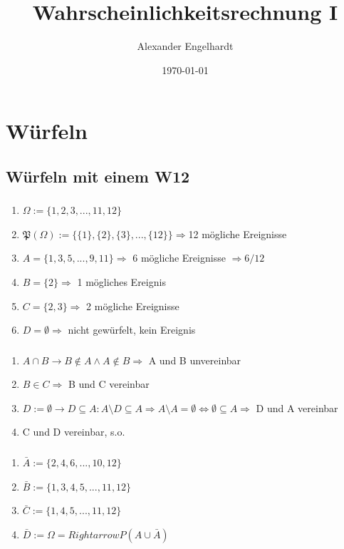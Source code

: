 \documentclass[12pt,a4paper]{article}
\title{Wahrscheinlichkeitsrechnung I}
\author{Alexander Engelhardt}
\date{\today}
\begin{document}
    \maketitle
    \setcounter{section}{1}
    \section{Würfeln}
    \subsection{Würfeln mit einem W12}
    \subsubsection{}
    \begin{enumerate}
        \item $\Omega := \{1, 2, 3, ..., 11, 12\}$ %
        \item $\mathfrak{P}(\Omega) := \{\{1\},\{2\}, \{3\}, ..., \{12\}\} \Rightarrow $12 mögliche Ereignisse %
        \item $A = \{1, 3, 5, ..., 9, 11\} \Rightarrow$ 6 mögliche Ereignisse $\Rightarrow 6/12$
        \item $B = \{2\} \Rightarrow$ 1 mögliches Ereignis
        \item $C = \{2, 3\} \Rightarrow$ 2 mögliche Ereignisse
        \item $D = \emptyset \Rightarrow$ nicht gewürfelt, kein Ereignis
    \end{enumerate}
    \subsubsection{}
    \begin{enumerate}
        \item $A \cap B \rightarrow B \notin A \land A \notin B \Rightarrow$ A und B unvereinbar
        \item $B \in C \Rightarrow$ B und C vereinbar
        \item $D := \emptyset \rightarrow D \subseteq A : A \setminus D \subseteq A \Rightarrow A \setminus A = \emptyset \Leftrightarrow \emptyset \subseteq A \Rightarrow$ D und A vereinbar
        \item C und D vereinbar, s.o.
    \end{enumerate}
    \subsubsection{}
    \begin{enumerate}
        \item $\bar{A} := \{2, 4, 6, ..., 10, 12\}$
        \item $\bar{B} := \{1, 3, 4, 5, ..., 11, 12\}$
        \item $\bar{C} := \{1, 4, 5, ..., 11, 12\}$
        \item $\bar{D} := \Omega =Rightarrow P(A \cup \bar{A})$
    \end{enumerate}
\end{document}

